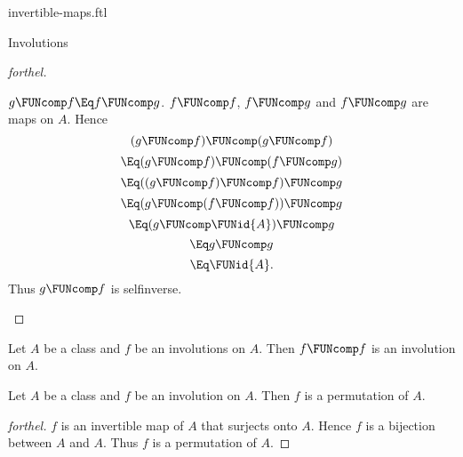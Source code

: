 \documentclass{stex}
\begin{document}
\begin{smodule}{invertible-maps.ftl}
\begin{sfragment}{Involutions}
\begin{proof}[forthel]
    \begin{case}{$g \FUNcomp f \Eq f \FUNcomp g$.}
      $f \FUNcomp f$, $f \FUNcomp g$ and $f \FUNcomp g$ are maps on $A$.
      Hence
      \[  (g \FUNcomp f) \FUNcomp (g \FUNcomp f)       \]
      \[    \Eq (g \FUNcomp f) \FUNcomp (f \FUNcomp g)   \]
      \[    \Eq ((g \FUNcomp f) \FUNcomp f) \FUNcomp g   \]
      \[    \Eq (g \FUNcomp (f \FUNcomp f)) \FUNcomp g   \]
      \[    \Eq (g \FUNcomp \FUNid{A}) \FUNcomp g       \]
      \[    \Eq g \FUNcomp g                       \]
      \[    \Eq \FUNid{A}.                        \]
      Thus $g \FUNcomp f$ is selfinverse.
    \end{case}
  \end{proof}

  \begin{corollary}[forthel,id=FOUNDATIONS_09_5958206868160512]
    Let $A$ be a class and $f$ be an involutions on $A$.
    Then $f \FUNcomp f$ is an involution on $A$.
  \end{corollary}

  \begin{proposition}[forthel,id=FOUNDATIONS_09_2314262743613440]
    Let $A$ be a class and $f$ be an involution on $A$.
    Then $f$ is a permutation of $A$.
  \end{proposition}
  \begin{proof}[forthel]
    $f$ is an invertible map of $A$ that surjects onto $A$.
    Hence $f$ is a bijection between $A$ and $A$.
    Thus $f$ is a permutation of $A$.
  \end{proof}
\end{sfragment}
\end{smodule}
\end{document}
